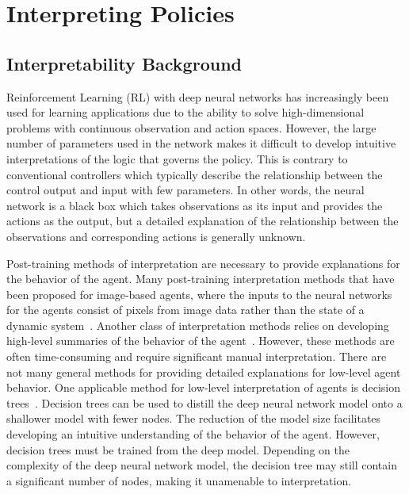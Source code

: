 
\chapter{Interpreting Policies}
\label{chapter5}



\section{Interpretability Background} 

Reinforcement Learning (RL) with deep neural networks has increasingly been used for learning applications due to the ability to solve high-dimensional problems with continuous observation and action spaces. However, the large number of parameters used in the network makes it difficult to develop intuitive interpretations of the logic that governs the policy. This is contrary to conventional controllers which typically describe the relationship between the control output and input with few parameters. In other words, the neural network is a black box which takes observations as its input and provides the actions as the output, but a detailed explanation of the relationship between the observations and corresponding actions is generally unknown.

Post-training methods of interpretation are necessary to provide explanations for the behavior of the agent. Many post-training interpretation methods that have been proposed for image-based agents, where the inputs to the neural networks for the agents consist of pixels from image data rather than the state of a dynamic system~\cite{Alharin:2020a}. Another class of interpretation methods relies on developing high-level summaries of the behavior of the agent~\cite{Lu:2023a}. However, these methods are often time-consuming and require significant manual interpretation.
%
There are not many general methods for providing detailed explanations for low-level agent behavior. One applicable method for low-level interpretation of agents is decision trees~\cite{Bastani:2018a}. Decision trees can be used to distill the deep neural network model onto a shallower model with fewer nodes. The reduction of the model size facilitates developing an intuitive understanding of the behavior of the agent. However, decision trees must be trained from the deep model.
%
Depending on the complexity of the deep neural network model, the decision tree may still contain a significant number of nodes, making it unamenable to interpretation.


